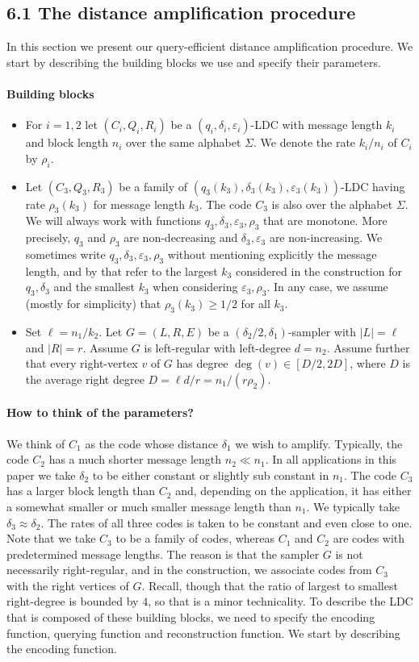 \documentclass[10pt,a4paper]{article}
\begin{document}
\subsection*{6.1 The distance amplification procedure}
In this section we present our query-efficient distance amplification procedure. We start by describing the building blocks we use and specify their parameters.
\paragraph{Building blocks}
\begin{itemize}
\item For $i=1,2$ let $(C_i,Q_i,R_i)$ be a $(q_i,\delta_i,\varepsilon_i)$-LDC with message length $k_i$ and block length $n_i$ over the same alphabet $\Sigma$. We denote the rate $k_i/n_i$ of $C_i$ by $\rho_i$.
\item Let $(C_3,Q_3,R_3)$ be a family of $(q_3(k_3),\delta_3(k_3),\varepsilon_3(k_3))$-LDC having rate $\rho_3(k_3)$ for message length $k_3$. The code $C_3$ is also over the alphabet $\Sigma$. We will always work with functions $q_3,\delta_3,\varepsilon_3,\rho_3$ that are monotone. More precisely, $q_3$ and $\rho_3$ are non-decreasing and $\delta_3,\varepsilon_3$ are non-increasing. We sometimes write $q_3,\delta_3,\varepsilon_3,\rho_3$ without mentioning explicitly the message length, and by that refer to the largest $k_3$ considered in the construction for $q_3,\delta_3$ and the smallest $k_3$ when considering $\varepsilon_3,\rho_3$. In any case, we assume (mostly for simplicity) that $\rho_3(k_3)\geq1/2$ for all $k_3$.
\item Set $\ell=n_1/k_2$. Let $G=(L,R,E)$ be a $(\delta_2/2,\delta_1)$-sampler with $|L|=\ell$ and $|R|=r$. Assume $G$ is left-regular with left-degree $d=n_2$. Assume further that every right-vertex $v$ of $G$ has degree $\deg(v)\in[D/2,2D]$, where $D$ is the average right degree $D=\ell d/r=n_1/(r\rho_2)$.
\end{itemize}
\paragraph{How to think of the parameters?}
We think of $C_1$ as the code whose distance $\delta_1$ we wish to amplify. Typically, the code $C_2$ has a much shorter message length $n_2\ll n_1$. In all applications in this paper we take $\delta_2$ to be either constant or slightly sub constant in $n_1$. The code $C_3$ has a larger block length than $C_2$ and, depending on the application, it has either a somewhat smaller or much smaller message length than $n_1$. We typically take $\delta_3\approx\delta_2$. The rates of all three codes is taken to be constant and even close to one. Note that we take $C_3$ to be a family of codes, whereas $C_1$ and $C_2$ are codes with predetermined message lengths. The reason is that the sampler $G$ is not necessarily right-regular, and in the construction, we associate codes from $C_3$ with the right vertices of $G$. Recall, though that the ratio of largest to smallest right-degree is bounded by $4$, so that is a minor technicality.
To describe the LDC that is composed of these building blocks, we need to specify the encoding function, querying function and reconstruction function. We start by describing the encoding function.
\end{document}
